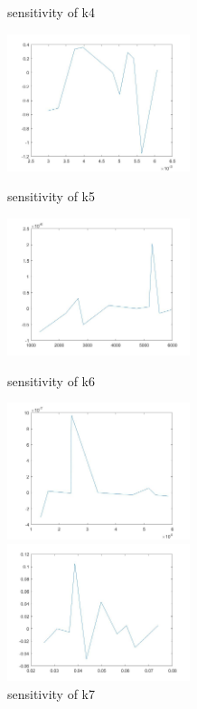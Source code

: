 \begin{figure}
\begin{varwidth}[t]{\textwidth}
	\end{varwidth}
	\caption{sensitivity of k4}
	\begin{varwidth}[t]{\textwidth}
		\vspace{0pt}
		\includegraphics[height=4cm]{s5.jpg}
	\end{varwidth}
	\caption{sensitivity of k5}
	\begin{varwidth}[t]{\textwidth}
		\vspace{0pt}
		\includegraphics[height=4cm]{s6.jpg}
	\end{varwidth}
	\caption{sensitivity of k6}
	\begin{varwidth}[t]{\textwidth}
		\vspace{0pt}
		\includegraphics[height=4cm]{s7.jpg}
	\end{varwidth}
	\caption{sensitivity of k7}
	\begin{varwidth}[t]{\textwidth}
		\vspace{0pt}
		\includegraphics[height=4cm]{s8.jpg}

\end{varwidth}
\end{figure}
